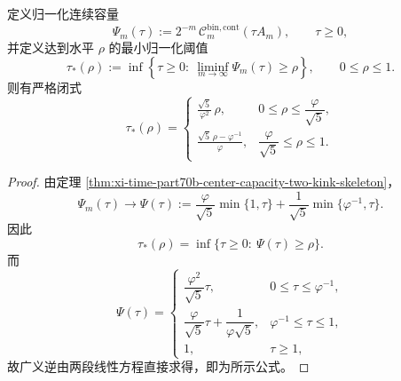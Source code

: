 \begin{theorem}[中心容量逆问题的闭式解]\label{thm:xi-time-part70ab-center-capacity-inverse-threshold-closed}
定义归一化连续容量
\[
\Psi_m(\tau):=
2^{-m}\,\mathcal C_m^{\mathrm{bin,cont}}(\tau A_m),
\qquad
\tau\ge 0,
\]
并定义达到水平 \(\rho\) 的最小归一化阈值
\[
\tau_\ast(\rho):=
\inf\left\{\tau\ge 0:\ \liminf_{m\to\infty}\Psi_m(\tau)\ge \rho\right\},
\qquad
0\le \rho\le 1.
\]
则有严格闭式
\[
\tau_\ast(\rho)=
\begin{cases}
\displaystyle \frac{\sqrt5}{\varphi^2}\,\rho,
& 0\le \rho\le \dfrac{\varphi}{\sqrt5},\\[3mm]
\displaystyle \frac{\sqrt5\,\rho-\varphi^{-1}}{\varphi},
& \dfrac{\varphi}{\sqrt5}\le \rho\le 1.
\end{cases}
\]
\end{theorem}
\begin{proof}
由定理 \ref{thm:xi-time-part70b-center-capacity-two-kink-skeleton}，
\[
\Psi_m(\tau)\longrightarrow \Psi(\tau):=
\frac{\varphi}{\sqrt5}\min\{1,\tau\}
+
\frac{1}{\sqrt5}\min\{\varphi^{-1},\tau\}.
\]
因此
\[
\tau_\ast(\rho)=\inf\{\tau\ge 0:\ \Psi(\tau)\ge \rho\}.
\]
而
\[
\Psi(\tau)=
\begin{cases}
\dfrac{\varphi^2}{\sqrt5}\tau, & 0\le \tau\le \varphi^{-1},\\[6pt]
\dfrac{\varphi}{\sqrt5}\tau+\dfrac{1}{\varphi\sqrt5}, & \varphi^{-1}\le \tau\le 1,\\[8pt]
1, & \tau\ge 1,
\end{cases}
\]
故广义逆由两段线性方程直接求得，即为所示公式。
\end{proof}

